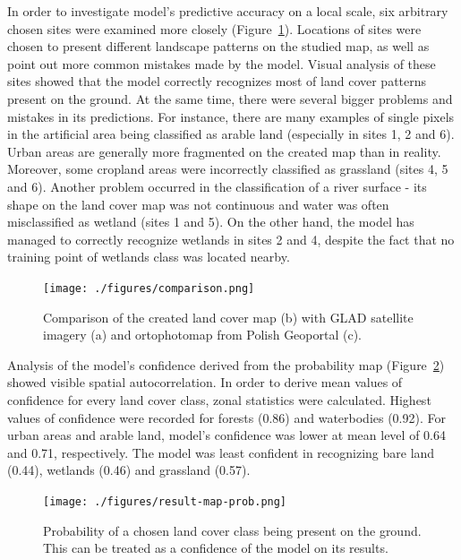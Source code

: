 \documentclass{amuthesis}
\begin{document}
In order to investigate model's predictive accuracy on a local scale,
six arbitrary chosen sites were examined more closely
(Figure~\ref{fig-rycina10}). Locations of sites were chosen to present
different landscape patterns on the studied map, as well as point out
more common mistakes made by the model. Visual analysis of these sites
showed that the model correctly recognizes most of land cover patterns
present on the ground. At the same time, there were several bigger
problems and mistakes in its predictions. For instance, there are many
examples of single pixels in the artificial area being classified as
arable land (especially in sites 1, 2 and 6). Urban areas are generally
more fragmented on the created map than in reality. Moreover, some
cropland areas were incorrectly classified as grassland (sites 4, 5 and
6). Another problem occurred in the classification of a river surface -
its shape on the land cover map was not continuous and water was often
misclassified as wetland (sites 1 and 5). On the other hand, the model
has managed to correctly recognize wetlands in sites 2 and 4, despite
the fact that no training point of wetlands class was located nearby.

\begin{figure}[H]

{\centering \texttt{[image: ./figures/comparison.png]}

}

\caption{\label{fig-rycina10}Comparison of the created land cover map
(b) with GLAD satellite imagery (a) and ortophotomap from Polish
Geoportal (c).}

\end{figure}

Analysis of the model's confidence derived from the probability map
(Figure~\ref{fig-rycina11}) showed visible spatial autocorrelation. In
order to derive mean values of confidence for every land cover class,
zonal statistics were calculated. Highest values of confidence were
recorded for forests (0.86) and waterbodies (0.92). For urban areas and
arable land, model's confidence was lower at mean level of 0.64 and
0.71, respectively. The model was least confident in recognizing bare
land (0.44), wetlands (0.46) and grassland (0.57).

\begin{figure}[H]

{\centering \texttt{[image: ./figures/result-map-prob.png]}

}

\caption{\label{fig-rycina11}Probability of a chosen land cover class
being present on the ground. This can be treated as a confidence of the
model on its results.}

\end{figure}
\end{document}

